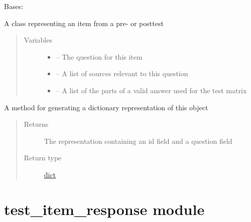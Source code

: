 \documentclass[letterpaper,10pt,english]{sphinxmanual}
\begin{document}
\begin{fulllineitems}
\label{\detokenize{test_item:test_item.TestItem}}
Bases: 

A class representing an item from a pre- or posttest
\begin{quote}\begin{description}
\item[{Variables}] \leavevmode\begin{itemize}
\item {} 
 -- The question for this item

\item {} 
 -- A list of sources relevant to this question

\item {} 
 -- A list of the parts of a valid answer used for the test matrix

\end{itemize}

\end{description}\end{quote}

\begin{fulllineitems}
\label{\detokenize{test_item:test_item.TestItem.to_dict}}
A method for generating a dictionary representation of this object
\begin{quote}\begin{description}
\item[{Returns}] \leavevmode
The representation containing an id field and a question field

\item[{Return type}] \leavevmode
\href{https://docs.python.org/2/library/stdtypes.html\#dict}{dict}

\end{description}\end{quote}

\end{fulllineitems}


\end{fulllineitems}



\section{test\_item\_response module}
\label{\detokenize{test_item_response:module-test_item_response}}\label{\detokenize{test_item_response::doc}}\label{\detokenize{test_item_response:test-item-response-module}}
\end{document}
